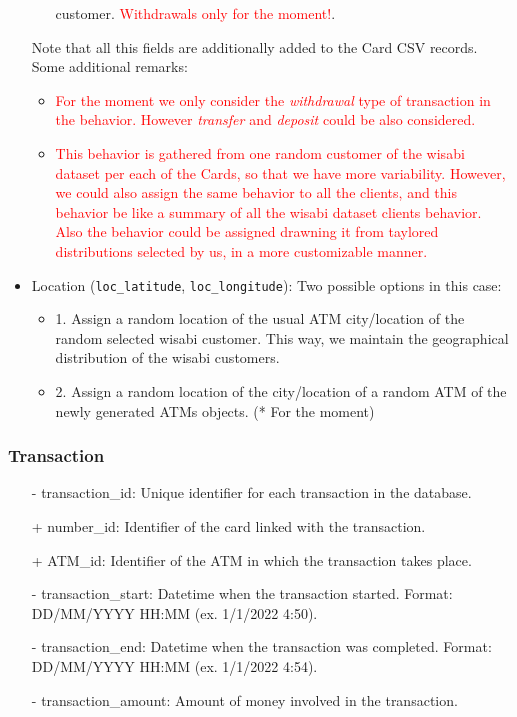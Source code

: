 \documentclass{article}
\begin{document}
\begin{itemize}
\begin{itemize}
        customer. \textcolor{red}{Withdrawals only for the moment!}.
    \end{itemize}
    Note that all this fields are additionally added to the Card CSV records.
    Some additional remarks:
    \begin{itemize}
        \item \textcolor{red}{For the moment we only consider the \textit{withdrawal} type of transaction in the behavior. However \textit{transfer} and \textit{deposit} could be also considered.}
        \item \textcolor{red}{This behavior is gathered from one random customer of the wisabi dataset per each of the Cards, so that we have more variability. However, we could also assign the same behavior to all the clients, and this behavior be like a summary of all the wisabi dataset clients behavior. Also the behavior could be assigned drawning it from taylored distributions selected by us, in a more customizable manner.}   
    \end{itemize}
    \item Location (\texttt{loc\_latitude}, \texttt{loc\_longitude}): Two possible options in this case:
    \begin{itemize}
        \item 1. Assign a random location of the usual ATM city/location of the random selected wisabi customer. This way, we maintain the geographical distribution of the wisabi customers.
        \item 2. Assign a random location of the city/location of a random ATM of the newly generated ATMs objects. (* For the moment)
    \end{itemize}
\end{itemize}

\subsubsection*{Transaction}

\begin{itemize}
\item[-] transaction\_id: Unique identifier for each transaction in the database.
\item[+] number\_id: Identifier of the card linked with the transaction.
\item[+] ATM\_id: Identifier of the ATM in which the transaction takes place.
\item[-] transaction\_start: Datetime when the transaction started. Format: DD/MM/YYYY HH:MM (ex. 1/1/2022 4:50).
\item[-] transaction\_end: Datetime when the transaction was completed. Format: DD/MM/YYYY HH:MM (ex. 1/1/2022 4:54).
\item[-] transaction\_amount: Amount of money involved in the transaction.
\end{itemize}
\end{document}
